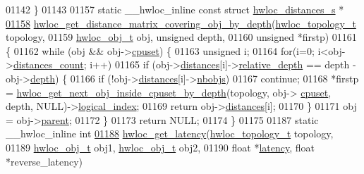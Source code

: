 \begin{DoxyCode}
{{01142 \}
01143 
01157 \textcolor{keyword}{static} \_\_hwloc\_inline \textcolor{keyword}{const} \textcolor{keyword}{struct }\hyperlink{a00014}{hwloc_distances_s} *
\hypertarget{a00031_source_l01158}{}\hyperlink{a00063_ga186ac2711b98a12cf46d58cd005fbb51}{01158} \hyperlink{a00063_ga186ac2711b98a12cf46d58cd005fbb51}{hwloc_get_distance_matrix_covering_obj_by_depth}(\hyperlink{a00039_ga9d1e76ee15a7dee158b786c30b6a6e38}{hwloc_topology_t} topology,
01159                                                 \hyperlink{a00016}{hwloc_obj_t} obj, \textcolor{keywordtype}{unsigned} depth,
01160                                                 \textcolor{keywordtype}{unsigned} *firstp)
01161 \{
01162   \textcolor{keywordflow}{while} (obj && obj->\hyperlink{a00016_a67925e0f2c47f50408fbdb9bddd0790f}{cpuset}) \{
01163     \textcolor{keywordtype}{unsigned} i;
01164     \textcolor{keywordflow}{for}(i=0; i<obj->\hyperlink{a00016_a8be6f63eca4da91000c832280db927b7}{distances_count}; i++)
01165       \textcolor{keywordflow}{if} (obj->\hyperlink{a00016_a9a5dd75596edc48fe834f81988cdc0d6}{distances}[i]->\hyperlink{a00014_a6fe066eaf62ee448aa05bab8e7217ff7}{relative_depth} == depth - obj->\hyperlink{a00016_a9d82690370275d42d652eccdea5d3ee5}{depth}) \{
01166         \textcolor{keywordflow}{if} (!obj->\hyperlink{a00016_a9a5dd75596edc48fe834f81988cdc0d6}{distances}[i]->\hyperlink{a00014_a4ca2af858cebbce7324ec49903d09474}{nbobjs})
01167           \textcolor{keywordflow}{continue};
01168         *firstp = \hyperlink{a00054_ga8af256c2572f16520f95440b884c1bd6}{hwloc_get_next_obj_inside_cpuset_by_depth}(topology, obj->
      \hyperlink{a00016_a67925e0f2c47f50408fbdb9bddd0790f}{cpuset}, depth, NULL)->\hyperlink{a00016_a0d07fb7b8935e137c94d75a3eb492ae9}{logical_index};
01169         \textcolor{keywordflow}{return} obj->\hyperlink{a00016_a9a5dd75596edc48fe834f81988cdc0d6}{distances}[i];
01170       \}
01171     obj = obj->\hyperlink{a00016_adc494f6aed939992be1c55cca5822900}{parent};
01172   \}
01173   \textcolor{keywordflow}{return} NULL;
01174 \}
01175 
01187 \textcolor{keyword}{static} \_\_hwloc\_inline \textcolor{keywordtype}{int}
\hypertarget{a00031_source_l01188}{}\hyperlink{a00063_ga9addde99e34b815df47625f1d6191839}{01188} \hyperlink{a00063_ga9addde99e34b815df47625f1d6191839}{hwloc_get_latency}(\hyperlink{a00039_ga9d1e76ee15a7dee158b786c30b6a6e38}{hwloc_topology_t} topology,
01189                    \hyperlink{a00016}{hwloc_obj_t} obj1, \hyperlink{a00016}{hwloc_obj_t} obj2,
01190                    \textcolor{keywordtype}{float} *\hyperlink{a00014_a0f70f48d1bfb18e5e2008825da2967c9}{latency}, \textcolor{keywordtype}{float} *reverse\_latency)
}}
\end{DoxyCode}
